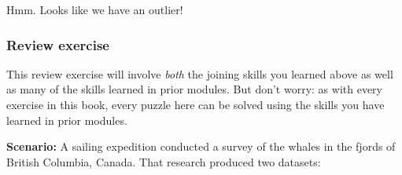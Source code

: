 \documentclass[
]{book}
\begin{document}
Hmm. Looks like we have an outlier!

\hypertarget{review-exercise-2}{%
\subsubsection*{Review exercise}\label{review-exercise-2}}

This review exercise will involve \emph{both} the joining skills you learned above as well as many of the skills learned in prior modules. But don't worry: as with every exercise in this book, every puzzle here can be solved using the skills you have learned in prior modules.

\textbf{Scenario:} A sailing expedition conducted a survey of the whales in the fjords of British Columbia, Canada. That research produced two datasets:
\end{document}
